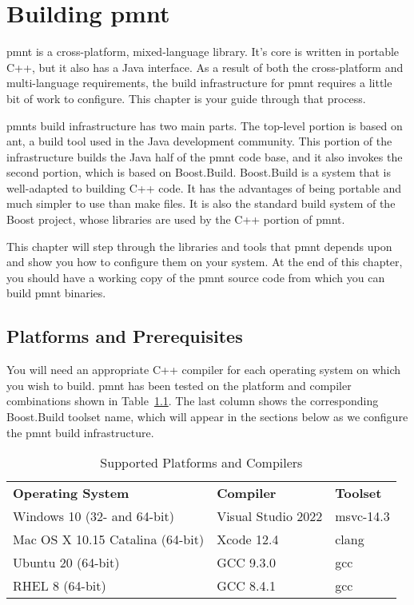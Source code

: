 
\chapter{Building \acl{pmnt}}
\label{chapter-building-parliament}

\ac{pmnt} is a cross-platform, mixed-language library.  It's core is written in portable C++, but it also has a Java interface.  As a result of both the cross-platform and multi-language requirements, the build infrastructure for \ac{pmnt} requires a little bit of work to configure.  This chapter is your guide through that process.

\acp{pmnt} build infrastructure has two main parts.  The top-level portion is based on ant, a build tool used in the Java development community.  This portion of the infrastructure builds the Java half of the \ac{pmnt} code base, and it also invokes the second portion, which is based on Boost.Build.  Boost.Build is a system that is well-adapted to building C++ code.  It has the advantages of being portable and much simpler to use than make files.  It is also the standard build system of the Boost project, whose libraries are used by the C++ portion of \ac{pmnt}.

This chapter will step through the libraries and tools that \ac{pmnt} depends upon and show you how to configure them on your system.  At the end of this chapter, you should have a working copy of the \ac{pmnt} source code from which you can build \ac{pmnt} binaries.

\section{Platforms and Prerequisites}

You will need an appropriate C++ compiler for each operating system on which you wish to build.  \ac{pmnt} has been tested on the platform and compiler combinations shown in Table~\ref{platforms-and-compilers}.  The last column shows the corresponding Boost.Build toolset name, which will appear in the sections below as we configure the \ac{pmnt} build infrastructure.

\begin{table}[htbp]
	\centering
	\begin{tabular}{lll}
		\toprule
		\textbf{Operating System} & \textbf{Compiler} & \textbf{Toolset} \\
		\headingrule
		Windows 10 (32- and 64-bit) & Visual Studio 2022 & msvc-14.3 \\
		\midrule
		Mac OS X 10.15 Catalina (64-bit) & Xcode 12.4 & clang \\
		\midrule
		Ubuntu 20 (64-bit) & GCC 9.3.0 & gcc \\
		\midrule
		RHEL 8 (64-bit) & GCC 8.4.1 & gcc \\
		\bottomrule
	\end{tabular}
	\caption{Supported Platforms and Compilers}
	\label{platforms-and-compilers}
\end{table}

